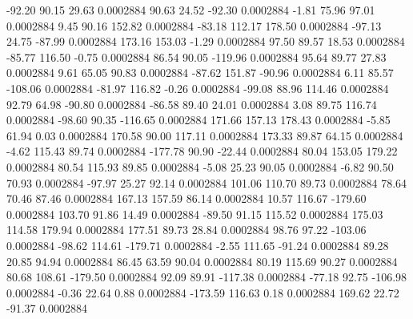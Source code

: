       -92.20       90.15       29.63     0.0002884
       90.63       24.52      -92.30     0.0002884
       -1.81       75.96       97.01     0.0002884
        9.45       90.16      152.82     0.0002884
      -83.18      112.17      178.50     0.0002884
      -97.13       24.75      -87.99     0.0002884
      173.16      153.03       -1.29     0.0002884
       97.50       89.57       18.53     0.0002884
      -85.77      116.50       -0.75     0.0002884
       86.54       90.05     -119.96     0.0002884
       95.64       89.77       27.83     0.0002884
        9.61       65.05       90.83     0.0002884
      -87.62      151.87      -90.96     0.0002884
        6.11       85.57     -108.06     0.0002884
      -81.97      116.82       -0.26     0.0002884
      -99.08       88.96      114.46     0.0002884
       92.79       64.98      -90.80     0.0002884
      -86.58       89.40       24.01     0.0002884
        3.08       89.75      116.74     0.0002884
      -98.60       90.35     -116.65     0.0002884
      171.66      157.13      178.43     0.0002884
       -5.85       61.94        0.03     0.0002884
      170.58       90.00      117.11     0.0002884
      173.33       89.87       64.15     0.0002884
       -4.62      115.43       89.74     0.0002884
     -177.78       90.90      -22.44     0.0002884
       80.04      153.05      179.22     0.0002884
       80.54      115.93       89.85     0.0002884
       -5.08       25.23       90.05     0.0002884
       -6.82       90.50       70.93     0.0002884
      -97.97       25.27       92.14     0.0002884
      101.06      110.70       89.73     0.0002884
       78.64       70.46       87.46     0.0002884
      167.13      157.59       86.14     0.0002884
       10.57      116.67     -179.60     0.0002884
      103.70       91.86       14.49     0.0002884
      -89.50       91.15      115.52     0.0002884
      175.03      114.58      179.94     0.0002884
      177.51       89.73       28.84     0.0002884
       98.76       97.22     -103.06     0.0002884
      -98.62      114.61     -179.71     0.0002884
       -2.55      111.65      -91.24     0.0002884
       89.28       20.85       94.94     0.0002884
       86.45       63.59       90.04     0.0002884
       80.19      115.69       90.27     0.0002884
       80.68      108.61     -179.50     0.0002884
       92.09       89.91     -117.38     0.0002884
      -77.18       92.75     -106.98     0.0002884
       -0.36       22.64        0.88     0.0002884
     -173.59      116.63        0.18     0.0002884
      169.62       22.72      -91.37     0.0002884
